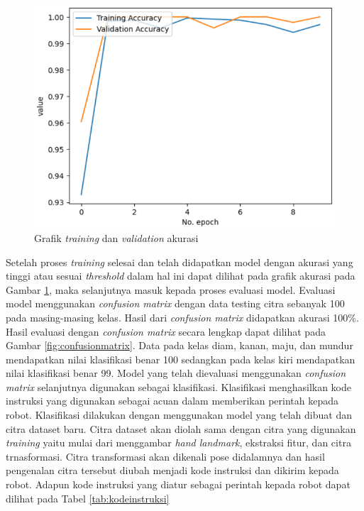 \begin{figure}[H]
  \centering
  \includegraphics[width=0.64\linewidth]{../Gambar/akurasi.png}
  \caption{Grafik \emph{training} dan \emph{validation} akurasi}
  \label{fig:akurasi}
\end{figure}

Setelah proses \emph{training} selesai dan telah didapatkan model dengan akurasi yang tinggi atau sesuai \emph{threshold} dalam hal ini dapat dilihat pada grafik akurasi pada Gambar \ref{fig:akurasi}, maka selanjutnya masuk kepada proses evaluasi model. Evaluasi model menggunakan \emph{confusion matrix} dengan data testing citra sebanyak 100 pada masing-masing kelas. Hasil dari \emph{confusion matrix} didapatkan akurasi 100\%. Hasil evaluasi dengan \emph{confusion matrix} secara lengkap dapat dilihat pada Gambar \ref{fig:confusionmatrix}. Data pada kelas diam, kanan, maju, dan mundur mendapatkan nilai klasifikasi benar 100 sedangkan pada kelas kiri mendapatkan nilai klasifikasi benar 99. Model yang telah dievaluasi menggunakan \emph{confusion matrix} selanjutnya digunakan sebagai klasifikasi. Klasifikasi menghasilkan kode instruksi yang digunakan sebagai acuan dalam memberikan perintah kepada robot. Klasifikasi dilakukan dengan menggunakan model yang telah dibuat dan citra dataset baru. Citra dataset akan diolah sama dengan citra yang digunakan \emph{training} yaitu mulai dari menggambar \emph{hand landmark}, ekstraksi fitur, dan citra trnasformasi. Citra transformasi akan dikenali pose didalamnya dan hasil pengenalan citra tersebut diubah menjadi kode instruksi dan dikirim kepada robot. Adapun kode instruksi yang diatur sebagai perintah kepada robot dapat dilihat pada Tabel \ref{tab:kodeinstruksi}

